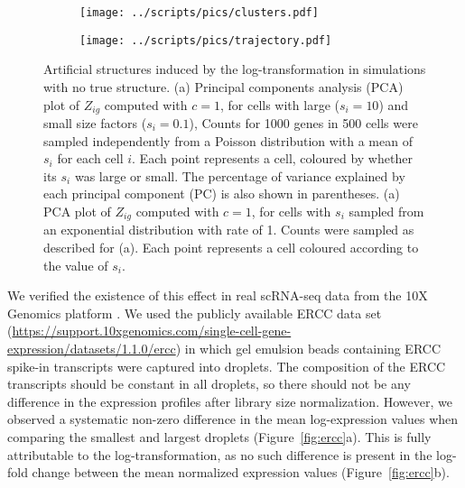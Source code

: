 \documentclass[10pt,letterpaper]{article}
\begin{document}
\begin{figure}[btp]
\centering
\begin{subfigure}[b]{0.49\textwidth}
    \texttt{[image: ../scripts/pics/clusters.pdf]}
    \caption{}
\end{subfigure}
\begin{subfigure}[b]{0.49\textwidth}
    \texttt{[image: ../scripts/pics/trajectory.pdf]}
    \caption{}
\end{subfigure}
\caption{Artificial structures induced by the log-transformation in simulations with no true structure.
(a) Principal components analysis (PCA) plot of $Z_{ig}$ computed with $c=1$, for cells with large ($s_i =10$) and small size factors ($s_i=0.1$), 
Counts for 1000 genes in 500 cells were sampled independently from a Poisson distribution with a mean of $s_i$ for each cell $i$. 
Each point represents a cell, coloured by whether its $s_i$ was large or small.
The percentage of variance explained by each principal component (PC) is also shown in parentheses. 
(a) PCA plot of $Z_{ig}$ computed with $c=1$, for cells with $s_i$ sampled from an exponential distribution with rate of 1.
Counts were sampled as described for (a).
Each point represents a cell coloured according to the value of $s_i$.
}
\label{fig:structures}
\end{figure}

We verified the existence of this effect in real scRNA-seq data from the 10X Genomics platform \cite{zheng2017massively}.
We used the publicly available ERCC data set (\url{https://support.10xgenomics.com/single-cell-gene-expression/datasets/1.1.0/ercc}) in which gel emulsion beads containing ERCC spike-in transcripts were captured into droplets.
The composition of the ERCC transcripts should be constant in all droplets, so there should not be any difference in the expression profiles after library size normalization.
However, we observed a systematic non-zero difference in the mean log-expression values when comparing the smallest and largest droplets (Figure~\ref{fig:ercc}a).
This is fully attributable to the log-transformation, as no such difference is present in the log-fold change between the mean normalized expression values (Figure~\ref{fig:ercc}b).
\end{document}
